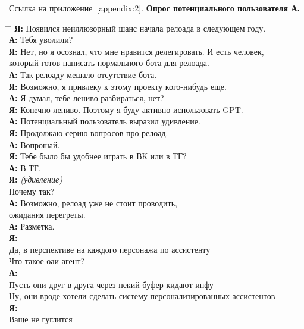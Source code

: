 Ссылка на приложение~\ref{appendix:2}.
\textbf{Опрос потенциального пользователя А.}
\begin{tabbing}
\hspace{3cm} \= \hspace{10cm} \= \kill
\textbf{Я:} \> Появился неиллюзорный шанс начала релоада в следующем году. \\
\textbf{А:} \> Тебя уволили? \\
\textbf{Я:} \> Нет, но я осознал, что мне нравится делегировать. И есть человек, \\
      \> который готов написать нормального бота для релоада. \\
\textbf{А:} \> Так релоаду мешало отсутствие бота. \\
\textbf{Я:} \> Возможно, я привлеку к этому проекту кого-нибудь еще. \\
\textbf{А:} \> Я думал, тебе лениво разбираться, нет? \\
\textbf{Я:} \> Конечно лениво. Поэтому я буду активно использовать GPT. \\
\textbf{А:} \> Потенциальный пользователь выразил удивление. \\
\textbf{Я:} \> Продолжаю серию вопросов про релоад. \\
\textbf{А:} \> Вопрошай. \\
\textbf{Я:} \> Тебе было бы удобнее играть в ВК или в ТГ? \\
\textbf{А:} \> В ТГ. \\
\textbf{Я:} \> \textit{(удивление)} \\
\> Почему так? \\
\textbf{А:} \> Возможно, релоад уже не стоит проводить, \\
\> ожидания перегреты. \\
\textbf{А:} \> Разметка. \\
\textbf{Я:}\\
Да, в перспективе на каждого персонажа по ассистенту\\
Что такое оаи агент?\\

\textbf{А:}\\
Пусть они друг в друга через некий буфер кидают инфу\\
Ну, они вроде хотели сделать систему персонализированных ассистентов\\

\textbf{Я:}\\
Ваще не гуглится\\


\end{tabbing}
